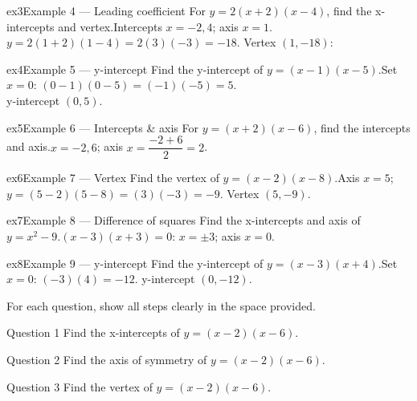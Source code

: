 \documentclass[11pt]{article}
\begin{document}
\begin{example}{ex3}{Example 4 --- Leading coefficient}
For $y=2(x+2)(x-4)$, find the x-intercepts and vertex.\soln Intercepts $x=-2,4$; axis $x=1$. \\ $y=2(1+2)(1-4)=2(3)(-3)=-18$. Vertex $(1,-18)$:
\end{example}

\begin{example}{ex4}{Example 5 --- y-intercept}
Find the y-intercept of $y=(x-1)(x-5)$.\soln Set $x=0$: $(0-1)(0-5)=(-1)(-5)=5$. \\ y-intercept $(0,5)$.
\end{example}

\begin{example}{ex5}{Example 6 --- Intercepts \& axis}
For $y=(x+2)(x-6)$, find the intercepts and axis.\soln $x=-2,6$; axis $x=\dfrac{-2+6}{2}=2$.
\end{example}

\begin{example}{ex6}{Example 7 --- Vertex}
Find the vertex of $y=(x-2)(x-8)$.\soln Axis $x=5$; $y=(5-2)(5-8)=(3)(-3)=-9$. Vertex $(5,-9)$.
\end{example}

\begin{example}{ex7}{Example 8 --- Difference of squares}
Find the x-intercepts and axis of $y=x^2-9$.\soln $(x-3)(x+3)=0$: $x=\pm3$; axis $x=0$.
\end{example}

\begin{example}{ex8}{Example 9 --- y-intercept}
Find the y-intercept of $y=(x-3)(x+4)$.\soln Set $x=0$: $(-3)(4)=-12$. y-intercept $(0,-12)$.
\end{example}

\clearpage
{}
For each question, show all steps clearly in the space provided.

\begin{qbox}{Question 1}
Find the x-intercepts of $y=(x-2)(x-6)$.\workspace{2.4cm}
\end{qbox}

\begin{qbox}{Question 2}
Find the axis of symmetry of $y=(x-2)(x-6)$.\workspace{2.4cm}
\end{qbox}

\begin{qbox}{Question 3}
Find the vertex of $y=(x-2)(x-6)$.\workspace{2.4cm}
\end{qbox}
\end{document}
